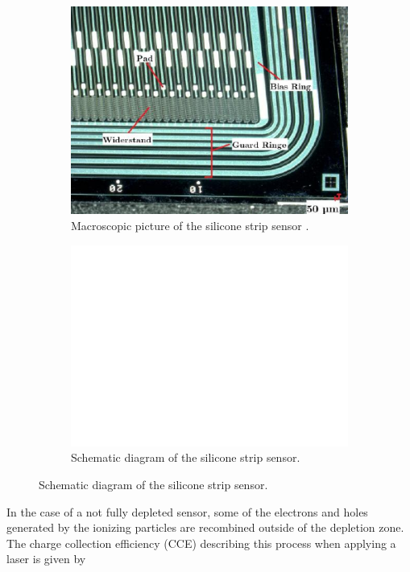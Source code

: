 \begin{figure}[H]
	\centering
	\begin{subfigure}{0.45\textwidth}
		\centering
		\includegraphics[width=\textwidth]{Assets/micro}
		\caption{Macroscopic picture of the silicone strip sensor \cite{V15}.}
		\label{fig:micro}
	\end{subfigure}
	\hfill
	\begin{subfigure}{0.45\textwidth}
		\includegraphics[width=\textwidth]{Assets/schematic}
		\caption{Schematic diagram of the silicone strip sensor\cite{V15}.}
		\label{fig:schematic}
	\end{subfigure}
\end{figure}


In the case of a not fully depleted sensor, some of the electrons and holes generated by the ionizing particles are recombined outside of the depletion zone. The charge collection efficiency (CCE) describing this process when applying a laser is given by 

